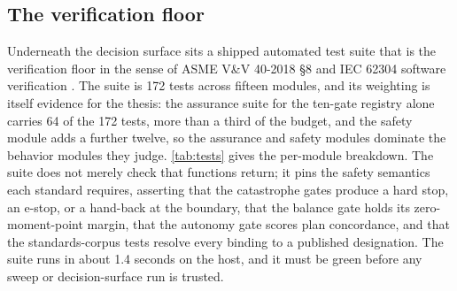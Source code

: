 \subsection{The verification floor}

Underneath the decision surface sits a shipped automated test suite that is the
verification floor in the sense of ASME V\&V 40-2018 \S8 and IEC 62304 software
verification \cite{iec62304}. The suite is 172 tests across fifteen modules, and
its weighting is itself evidence for the thesis: the assurance suite for the
ten-gate registry alone carries 64 of the 172 tests, more than a third of the
budget, and the safety module adds a further twelve, so the assurance and safety
modules dominate the behavior modules they judge. \autoref{tab:tests} gives the
per-module breakdown. The suite does not merely check that functions return; it
pins the safety semantics each standard requires, asserting that the catastrophe
gates produce a hard stop, an e-stop, or a hand-back at the boundary, that the
balance gate holds its zero-moment-point margin, that the autonomy gate scores
plan concordance, and that the standards-corpus tests resolve every binding to a
published designation. The suite runs in about 1.4 seconds on the host, and it
must be green before any sweep or decision-surface run is trusted.

